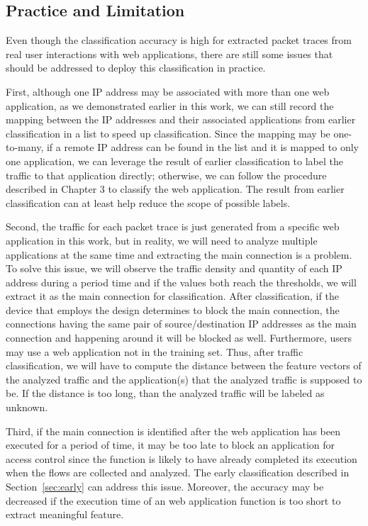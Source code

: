 \documentclass[preprint,12pt]{elsarticle}
\begin{document}
\subsection{Practice and Limitation}
\label{sec:app_limit}

Even though the classification accuracy is high for extracted packet traces from real user interactions with web applications, there are still some issues that should be addressed to deploy this classification in practice.

First, although one IP address may be associated with more than one web application, as we demonstrated earlier in this work, we can still record the mapping between the IP addresses and their associated applications from earlier classification in a list to speed up classification. Since the mapping may be one-to-many, if a remote IP address can be found in the list and it is mapped to only one application, we can leverage the result of earlier classification to label the traffic to that application directly; otherwise, we can follow the procedure described in Chapter 3 to classify the web application. The result from earlier classification can at least help reduce the scope of possible labels.

Second, the traffic for each packet trace is just generated from a specific web application in this work, but in reality, we will need to analyze multiple applications at the same time and extracting the main connection is a problem. To solve this issue, we will observe the traffic density and quantity of each IP address during a period time and if the values both reach the thresholds, we will extract it as the main connection for classification. After classification, if the device that employs the design determines to block the main connection, the connections having the same pair of source/destination IP addresses as the main connection and happening around it will be blocked as well. Furthermore, users may use a web application not in the training set. Thus, after traffic classification, we will have to compute the distance between the feature vectors of the analyzed traffic and the application(s) that the analyzed traffic is supposed to be. If the distance is too long, than the analyzed traffic will be labeled as unknown.


Third, if the main connection is identified after the web application has been executed for a period of time, it may be too late to block an application for access control since the function is likely to have already completed its execution when the flows are collected and analyzed. The early classification described in Section~\ref{sec:early} can address this issue. Moreover, the accuracy may be decreased if the execution time of an web application function is too short to extract meaningful feature.
\end{document}
